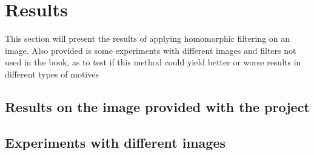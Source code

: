 \section{Results}
	This section will present the results of applying homomorphic filtering
	on an image. Also provided is some experiments with different images
	and filters not used in the book, as to test if this method could yield
	better or worse results in different types of motives %
	\subsection{Results on the image provided with the project}
	
	
	\subsection{Experiments with different images}

 
